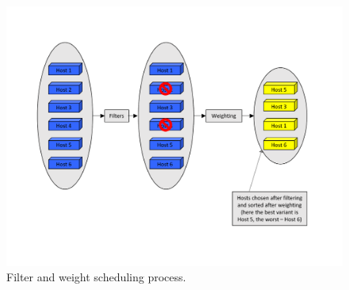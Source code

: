 \begin{figure}[h]
	\centering
	\includegraphics[clip= true, width= \columnwidth, trim=0cm 3cm 0cm 3cm]{images/nova-filter-weight.pdf}
	\caption{Filter and weight scheduling process.}
	\label{fig:OSnovascheduler}
\end{figure}

